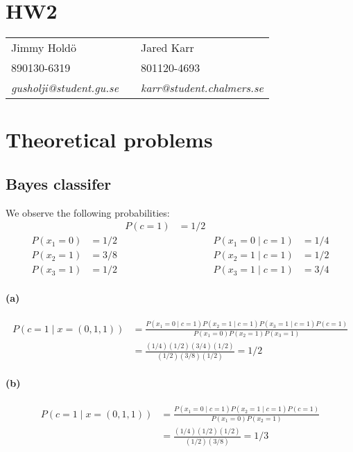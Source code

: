 \documentclass[a4paper,11pt]{article}
\DeclareMathOperator{\given}{\mid}
\begin{document}
\section*{HW2}

\begin{tabular*}{0.9\textwidth}{@{\extracolsep{\fill} } lll}
Jimmy Hold\"{o} & & Jared Karr\\
890130-6319 & & 801120-4693\\
\it{gusholji@student.gu.se} & & \it{karr@student.chalmers.se}\\
\end{tabular*}

\section{Theoretical problems}
\subsection{Bayes classifer}
We observe the following probabilities:
\begin{align*}
&&P(c=1)&=1/2 & &\\
P(x_1=0)&=1/2 &&& P(x_1=0\given c=1)&=1/4\\
P(x_2=1)&=3/8 &&& P(x_2=1\given c=1)&=1/2\\
P(x_3=1)&=1/2 &&& P(x_3=1\given c=1)&=3/4
\end{align*}

\paragraph{(a)}
\begin{align*}
  P(c=1\given x=(0, 1, 1))
  &=\frac{
    P(x_1=0\given c=1)
    P(x_2=1\given c=1)
    P(x_3=1\given c=1)
    P(c=1)
  }{
    P(x_1=0)
    P(x_2=1)
    P(x_3=1)
  }\\
  &=\frac{
    (1/4)(1/2)(3/4)(1/2)
  }{
    (1/2)(3/8)(1/2)
  }=1/2
\end{align*}

\paragraph{(b)}
\begin{align*}
  P(c=1\given x=(0, 1, 1))
  &=\frac{
    P(x_1=0\given c=1)
    P(x_2=1\given c=1)
    P(c=1)
  }{
    P(x_1=0)
    P(x_2=1)
  }\\
  &=\frac{
    (1/4)(1/2)(1/2)
  }{
    (1/2)(3/8)
  }=1/3
\end{align*}
\end{document}

